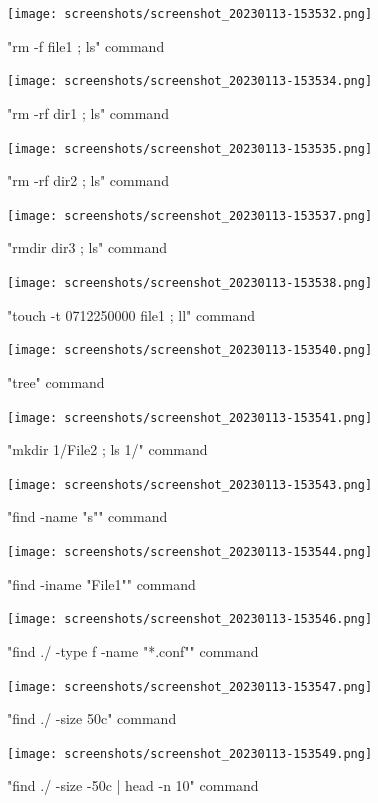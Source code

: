 \documentclass[b5paper]{article}
\begin{document}
\begin{figure} \centering \texttt{[image: screenshots/screenshot\_20230113-153532.png]} \caption{"rm -f file1 ; ls" command} \end{figure}
\begin{figure} \centering \texttt{[image: screenshots/screenshot\_20230113-153534.png]} \caption{"rm -rf dir1 ; ls" command} \end{figure}
\begin{figure} \centering \texttt{[image: screenshots/screenshot\_20230113-153535.png]} \caption{"rm -rf dir2 ; ls" command} \end{figure}
\begin{figure} \centering \texttt{[image: screenshots/screenshot\_20230113-153537.png]} \caption{"rmdir dir3 ; ls" command} \end{figure}
\begin{figure} \centering \texttt{[image: screenshots/screenshot\_20230113-153538.png]} \caption{"touch -t 0712250000 file1 ; ll" command} \end{figure}
\begin{figure} \centering \texttt{[image: screenshots/screenshot\_20230113-153540.png]} \caption{"tree" command} \end{figure}
\begin{figure} \centering \texttt{[image: screenshots/screenshot\_20230113-153541.png]} \caption{"mkdir 1/File2 ; ls 1/" command} \end{figure}
\begin{figure} \centering \texttt{[image: screenshots/screenshot\_20230113-153543.png]} \caption{"find -name "s"" command} \end{figure}
\begin{figure} \centering \texttt{[image: screenshots/screenshot\_20230113-153544.png]} \caption{"find -iname "File1"" command} \end{figure}
\begin{figure} \centering \texttt{[image: screenshots/screenshot\_20230113-153546.png]} \caption{"find ./ -type f -name "*.conf"" command} \end{figure}
\begin{figure} \centering \texttt{[image: screenshots/screenshot\_20230113-153547.png]} \caption{"find ./ -size 50c" command} \end{figure}
\begin{figure} \centering \texttt{[image: screenshots/screenshot\_20230113-153549.png]} \caption{"find ./ -size -50c | head -n 10" command} \end{figure}
\end{document}
